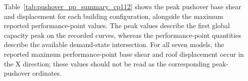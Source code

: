 
\begin{table}[!htbp]
\centering
\caption{Seven-model pushover and performance-point summary.}
\label{tab:pushover_pp_summary_cp112}
\scriptsize
{}

\end{table}
\FloatBarrier
\noindent Table~\ref{tab:pushover_pp_summary_cp112} shows the peak pushover base shear and displacement for each building configuration, alongside the maximum reported performance-point values. The peak values describe the first global capacity peak on the recorded curves, whereas the performance-point quantities describe the available demand-state intersection. For all seven models, the reported maximum performance-point base shear and roof displacement occur in the X direction; these values should not be read as the corresponding peak-pushover ordinates.

